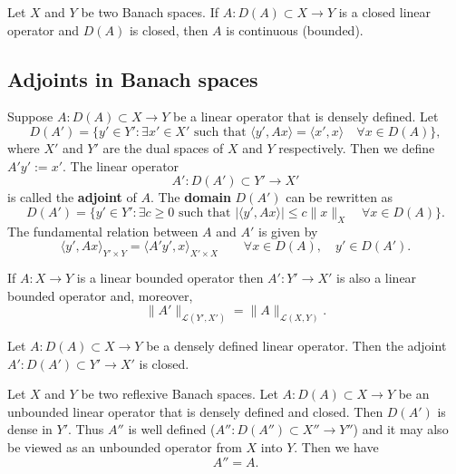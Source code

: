 \begin{theorem}
Let $X$ and $Y$ be two Banach spaces. If $A: D(A)\subset X\to Y$ is a closed linear operator and \textcolor[rgb]{1.00,0.00,0.00}{$D(A)$ is closed}, then \textcolor[rgb]{1.00,0.00,0.00}{$A$ is continuous (bounded)}.
\end{theorem}



\subsection{Adjoints in Banach spaces}
\begin{defn}[Adjoint $A'$]
Suppose $A: D(A)\subset X\to Y$ be a linear operator that is densely defined. Let
\[
D(A')=\{y'\in Y': \exists x'\in X' \textrm{ such that } \langle y', Ax\rangle=\langle x', x\rangle\quad \forall x\in D(A)\},
\]
where $X'$ and $Y'$ are the dual spaces of $X$ and $Y$ respectively.
Then we define $A'y':=x'$. The linear operator
\[
A': D(A')\subset Y'\to X'
\]
is called the \textbf{adjoint} of $A$. The \textbf{domain} $D(A')$ can be rewritten as
\[
D(A')=\{y'\in Y': \exists c\geq0 \textrm{ such that } |\langle y', Ax\rangle|\leq c\|x\|_X\quad \forall x\in D(A)\}.
\]
The fundamental relation between $A$ and $A'$ is given by
\[
\langle y', Ax \rangle_{Y'\times Y}=\langle A'y', x \rangle_{X'\times X}\quad\quad\forall x\in D(A),\quad y'\in D(A').
\]
\end{defn}

\begin{lemma}
If $A: X\to Y$ is a linear bounded operator then $A': Y'\to X'$ is also a linear bounded operator and, moreover,
\[
\|A'\|_{\mathcal L(Y', X')}=\|A\|_{\mathcal L(X, Y)}.
\]
\end{lemma}


\begin{lemma}
Let $A: D(A)\subset X\to Y$ be a densely defined linear operator. Then \textcolor[rgb]{1.00,0.00,0.00}{the adjoint $A': D(A')\subset Y'\to X'$ is closed}.
\end{lemma}

\begin{theorem}
Let $X$ and $Y$ be two \textcolor[rgb]{1.00,0.00,0.00}{reflexive} Banach spaces. Let $A: D(A)\subset X\to Y$ be an unbounded linear operator that is densely defined and closed. Then \textcolor[rgb]{1.00,0.00,0.00}{$D(A')$ is dense in $Y'$}. Thus $A''$ is well defined ($A'': D(A'')\subset X''\to Y''$) and it may
also be viewed as an unbounded operator from $X$ into $Y$. Then we have
\[
A''=A.
\]
\end{theorem}

